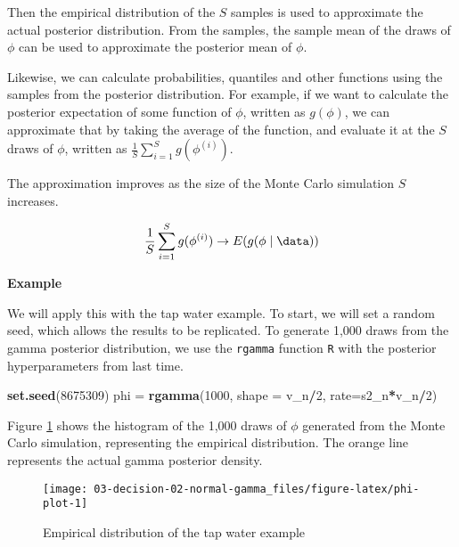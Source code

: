 \documentclass[]{book}
\newenvironment{Shaded}{\begin{snugshade}}{\end{snugshade}}
\newcommand{\KeywordTok}[1]{\textcolor[rgb]{0.13,0.29,0.53}{\textbf{#1}}}
\newcommand{\DataTypeTok}[1]{\textcolor[rgb]{0.13,0.29,0.53}{#1}}
\newcommand{\DecValTok}[1]{\textcolor[rgb]{0.00,0.00,0.81}{#1}}
\newcommand{\StringTok}[1]{\textcolor[rgb]{0.31,0.60,0.02}{#1}}
\newcommand{\OperatorTok}[1]{\textcolor[rgb]{0.81,0.36,0.00}{\textbf{#1}}}
\newcommand{\NormalTok}[1]{#1}
\theoremstyle{definition}
\theoremstyle{definition}
\theoremstyle{definition}
\theoremstyle{remark}
\begin{document}
Then the empirical distribution of the \(S\) samples is used to
approximate the actual posterior distribution. From the samples, the
sample mean of the draws of \(\phi\) can be used to approximate the
posterior mean of \(\phi\).

Likewise, we can calculate probabilities, quantiles and other functions
using the samples from the posterior distribution. For example, if we
want to calculate the posterior expectation of some function of
\(\phi\), written as \(g(\phi)\), we can approximate that by taking the
average of the function, and evaluate it at the \(S\) draws of \(\phi\),
written as \(\frac{1}{S}\sum^S_{i=1}g(\phi^{(i)})\).

The approximation improves as the size of the Monte Carlo simulation
\(S\) increases.

\[\frac{1}{S}\sum^S_{i=1}g(\phi^{(i)}) \rightarrow E(g(\phi \mid \data))\]

\textbf{Example}

We will apply this with the tap water example. To start, we will set a
random seed, which allows the results to be replicated. To generate
1,000 draws from the gamma posterior distribution, we use the
\texttt{rgamma} function \texttt{R} with the posterior hyperparameters
from last time.

\begin{Shaded}
\begin{Highlighting}[]
\KeywordTok{set.seed}\NormalTok{(}\DecValTok{8675309}\NormalTok{)}
\NormalTok{phi =}\StringTok{ }\KeywordTok{rgamma}\NormalTok{(}\DecValTok{1000}\NormalTok{, }\DataTypeTok{shape =}\NormalTok{ v_n}\OperatorTok{/}\DecValTok{2}\NormalTok{, }\DataTypeTok{rate=}\NormalTok{s2_n}\OperatorTok{*}\NormalTok{v_n}\OperatorTok{/}\DecValTok{2}\NormalTok{)}
\end{Highlighting}
\end{Shaded}

Figure \ref{fig:phi-plot} shows the histogram of the 1,000 draws of
\(\phi\) generated from the Monte Carlo simulation, representing the
empirical distribution. The orange line represents the actual gamma
posterior density.

\begin{figure}

{\centering \texttt{[image: 03-decision-02-normal-gamma\_files/figure-latex/phi-plot-1]} 

}

\caption{Empirical distribution of the tap water example}\label{fig:phi-plot}
\end{figure}
\end{document}
